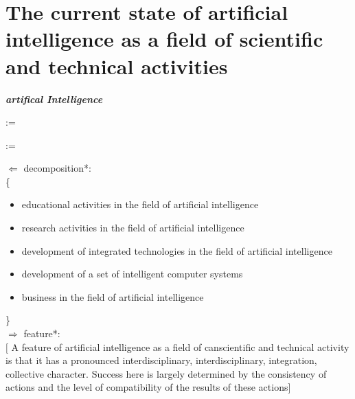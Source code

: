 \documentclass[10pt, a4paper]{proc}
\begin{document}
 \section{The current state of artificial intelligence as a field of scientific and technical activities}
 \normalsize
 \textbf{\textit{artifical Intelligence}}
 \vspace{-0.3cm}
 \setlength{\columnsep}{-6cm}
 \begin{multicols}{2}
  :=

  \columnbreak
 \end{multicols}
 \begin{multicols}{2}
  :=

  \columnbreak
 \end{multicols}
 \(\Leftarrow\) decomposition*:\\
 \{
 \begin{itemize}
  \item educational activities in the field of artificial intelligence
  \item research activities in the field of artificial intelligence
  \item development of integrated technologies in the field of artificial intelligence
  \item development of a set of intelligent computer systems
  \item business in the field of artificial intelligence
 \end{itemize}
 \}\\
 \(\Rightarrow\) feature*:\\
 \indent\([\)
 A feature of artificial intelligence as a field of canscientific and technical activity is that it has a pronounced interdisciplinary, interdisciplinary, integration, collective character. Success here is largely determined by the consistency of actions and the level of compatibility of the results of these actions]\\
\end{document}
